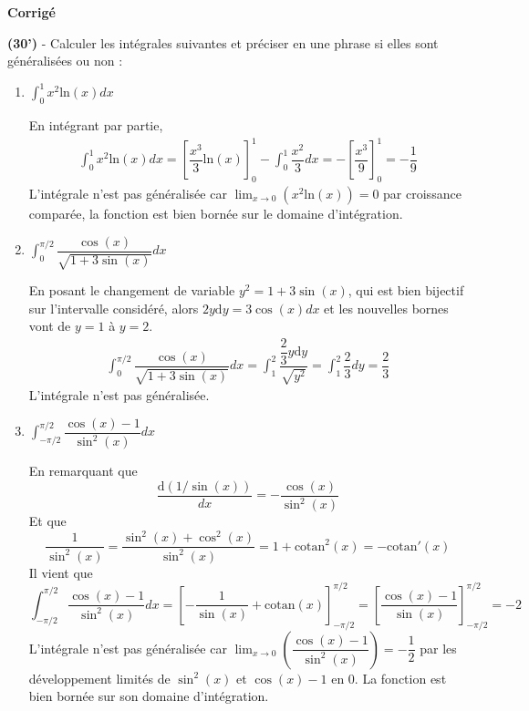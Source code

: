 \documentclass[10pt,a4paper,notitlepage]{article}
\begin{document}
\begin{center}
\large{\textbf{Corrigé}}
\end{center}
\begin{definition}[]
\hspace{0ex}\textbf{(30')} - Calculer les intégrales suivantes et préciser en une phrase si elles sont généralisées ou non :
\begin{enumerate}
   \item ${\displaystyle \int_0^1 x^2 \mathrm{ln}(x) dx}$ 
   
   \begin{center}
   En intégrant par partie,
   \begin{align*}
   \int_0^1 x^2 \mathrm{ln}(x) dx = \left[\dfrac{x^3}{3} \mathrm{ln}(x)\right]_0^1 - \int_0^1 \dfrac{x^2}{3}dx   =-\left[\dfrac{x^3}{9}\right]_0^1 =-\dfrac{1}{9}
   \end{align*}
   L'intégrale n'est pas généralisée car $\lim_{x \to 0} \left(x^2 \mathrm{ln}(x)\right)= 0$ par croissance comparée, la fonction est bien bornée sur le domaine d'intégration.
   \end{center}
   \item ${\displaystyle \int_0^{\pi/2} \dfrac{\cos(x)}{\sqrt{1+3\sin(x)}}dx}$
   \begin{center}
   En posant le changement de variable $y^2=1+3\sin(x)$, qui est bien bijectif sur l'intervalle considéré, alors $2y\mathrm{d}y=3\cos(x)dx$ et les nouvelles bornes vont de $y=1$ à $y=2$.
   \begin{align*}
   \int_0^{\pi/2} \dfrac{\cos(x)}{\sqrt{1+3\sin(x)}}dx = \int_1^2 \dfrac{\dfrac{2}{3}y\mathrm{d}y}{\sqrt{y^2}}=\int_1^2 \dfrac{2}{3}dy=\dfrac{2}{3}
   \end{align*}
   L'intégrale n'est pas généralisée.
   \end{center}
   \item  ${\displaystyle \int_{-\pi/2}^{\pi/2} \dfrac{\cos(x)-1}{\sin^2(x)}dx}$
   \begin{center}
   En remarquant que $$\dfrac{\mathrm{d}(1/\sin(x))}{dx}=-\dfrac{\cos(x)}{\sin^2(x)}$$
   Et que $$ \dfrac{1}{\sin^2(x)}=\dfrac{\sin^2(x)+\cos^2(x)}{\sin^2(x)}=1+\mathrm{cotan}^2(x)=-\mathrm{cotan}'(x)$$
   Il vient que $$\int_{-\pi/2}^{\pi/2} \dfrac{\cos(x)-1}{\sin^2(x)}dx = \left[-\dfrac{1}{\sin(x)}+\mathrm{cotan}(x)\right]_{-\pi/2}^{\pi/2} =\left[\dfrac{\cos(x)-1}{\sin(x)}\right]_{-\pi/2}^{\pi/2}=-2$$
   L'intégrale n'est pas généralisée car $\lim_{x \to 0}\left(\dfrac{\cos(x)-1}{\sin^2(x)}\right)=-\dfrac{1}{2}$ par les développement limités de $\sin^2(x)$ et $\cos(x) -1$ en $0$. La fonction est bien bornée sur son domaine d'intégration.
   \end{center}
\end{enumerate}
\end{definition}
\end{document}
